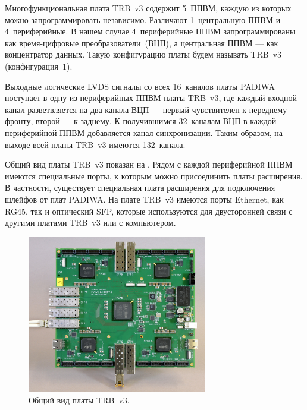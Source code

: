 
Многофункциональная плата TRB~v3 содержит 5~ППВМ, каждую из которых можно запрограммировать независимо. Различают 1~центральную ППВМ и 4~периферийные. В нашем случае 4~периферийные ППВМ запрограммированы как время-цифровые преобразователи~(ВЦП), а центральная ППВМ --- как концентратор данных. Такую конфигурацию платы будем называть TRB~v3 (конфигурация~1).

Выходные логические LVDS сигналы со всех 16~каналов платы PADIWA поступает в одну из периферийных ППВМ платы TRB~v3, где каждый входной канал разветвляется на два канала ВЦП --- первый чувствителен к переднему фронту, второй --- к заднему. К получившимся 32~каналам ВЦП в каждой периферийной ППВМ добавляется канал синхронизации. Таким образом, на выходе всей платы TRB~v3 имеются 132~канала.

Общий вид платы TRB~v3 показан на . Рядом с каждой периферийной ППВМ имеются специальные порты, к которым можно присоединить платы расширения. В частности, существует специальная плата расширения для подключения шлейфов от плат PADIWA. На плате TRB~v3 имеются порты Ethernet, как RG45, так и оптический SFP, которые используются для двусторонней связи с другими платами TRB~v3 или с компьютером.

\begin{figure}[H]
\centering
\includegraphics[width=0.7\textwidth]{pictures/7_TRB3_crop.jpg}
\caption{Общий вид платы TRB~v3.}
\label{fig:TRB}
\end{figure}

